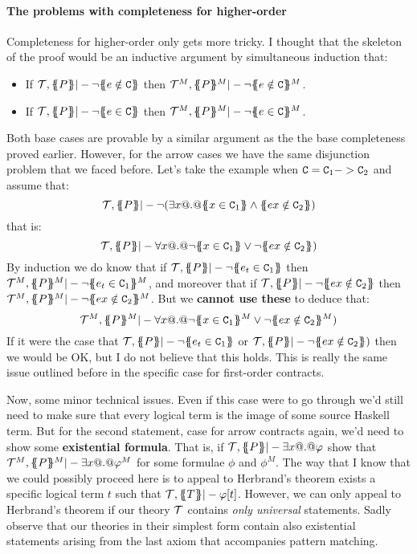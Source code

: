 \documentclass[preprint]{sigplanconf}
\begin{document}
\paragraph{The problems with completeness for higher-order}

Completeness for higher-order only gets more tricky. I thought that the skeleton of the proof
would be an inductive argument by simultaneous induction that:
\begin{itemize}
  \item If $\Th,\ptrans{}{P} |- \neg \ctrans{}{}{e \notin \Ct}$ then 
           $\Th^M,\ptrans{}{P}^M |- \neg \ctrans{}{}{e \notin \Ct}^M$.
  \item If $\Th,\ptrans{}{P} |- \neg \ctrans{}{}{e \in \Ct}$ then 
           $\Th^M,\ptrans{}{P}^M |- \neg \ctrans{}{}{e \in \Ct}^M$.
\end{itemize}
Both base cases are provable by a similar argument as the the base completeness proved earlier.
However, for the arrow cases we have the same disjunction problem that we faced before. Let's
take the example when ${\tt C} = {\tt C}_1 -> {\tt C}_2$ and assume that:
\[ \Th,\ptrans{}{P} |- \neg (\exists x @.@ \ctrans{}{}{x \in \Ct_1} \land \ctrans{}{}{e x \notin \Ct_2}) \] 
that is:
\[ \Th,\ptrans{}{P} |- \forall x @.@ \neg\ctrans{}{}{x \in \Ct_1} \lor \neg\ctrans{}{}{e x \notin \Ct_2}) \]
By induction we do know that if 
$\Th,\ptrans{}{P} |- \neg\ctrans{}{}{e_t \in \Ct_1}$ then 
$\Th^M,\ptrans{}{P}^M |- \neg\ctrans{}{}{e_t \in \Ct_1}^M$, and moreover
that if $\Th,\ptrans{}{P} |- \neg\ctrans{}{}{e x \notin \Ct_2}$ then 
$\Th^M,\ptrans{}{P}^M |- \neg\ctrans{}{}{e x \notin \Ct_2}^M$. But we {\bf cannot use these} to deduce that:
\[ \Th^M,\ptrans{}{P}^M |- \forall x @.@ \neg\ctrans{}{}{x \in \Ct_1}^M \lor \neg\ctrans{}{}{e x \notin \Ct_2}^M) \]
If it were the case that $\Th,\ptrans{}{P} |- \neg\ctrans{}{}{e_t \in \Ct_1}$ or
 $\Th,\ptrans{}{P} |- \neg\ctrans{}{}{e x \notin \Ct_2})$ then we would be OK, but I do not believe that
this holds. This is really the same issue outlined before in the specific case for first-order contracts.

Now, some minor technical issues. Even if this case were to go through we'd still need to make sure that
every logical term is the image of some source Haskell term. But for the second statement, case for arrow
contracts again, we'd need to show some {\bf existential formula}. That is, if 
${\cal T},\{\!\!\{P\}\!\!\} |- \exists x @.@ \varphi$ show that ${\cal T}^M,\{\!\!\{P\}\!\!\}^M |- \exists x @.@ \varphi^M$ for some
formulae $\phi$ and $\phi^M$. The way that I know that we could possibly proceed here is to appeal to 
Herbrand's theorem exists a specific logical term $t$ such that ${\cal T},\{\!\!\{T\}\!\!\} |- \varphi[t]$. However, 
we can only appeal to Herbrand's theorem if our theory ${\cal T}$ contains {\em only universal} statements. Sadly 
observe that our theories in their simplest form contain also existential statements arising 
from the last axiom that accompanies pattern matching.
\end{document}

